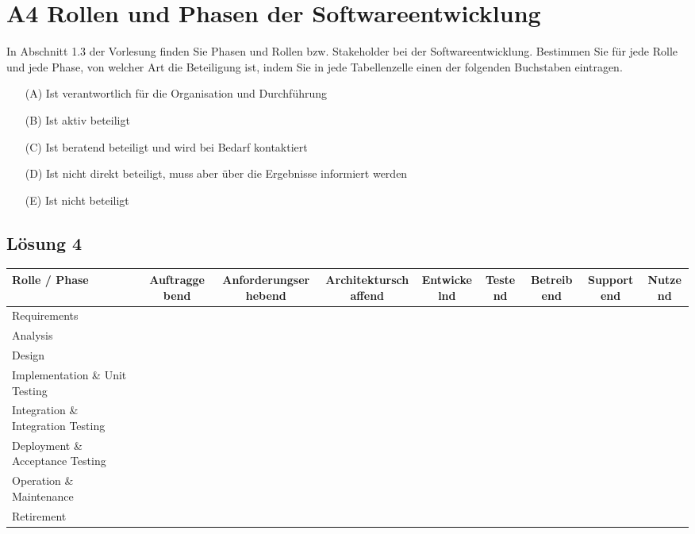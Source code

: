 \documentclass[main.tex]{subfiles}
\begin{document}
\section{A4 Rollen und Phasen der Softwareentwicklung}

In Abschnitt 1.3 der Vorlesung finden Sie Phasen und Rollen bzw. Stakeholder bei der Softwareentwicklung. Bestimmen Sie für jede Rolle und jede Phase, von welcher Art die Beteiligung ist, indem Sie in jede Tabellenzelle einen der folgenden Buchstaben eintragen.

\begin{enumerate}
    \item[(A)] Ist verantwortlich für die Organisation und Durchführung
    \item[(B)] Ist aktiv beteiligt
    \item[(C)] Ist beratend beteiligt und wird bei Bedarf kontaktiert
    \item[(D)] Ist nicht direkt beteiligt, muss aber über die Ergebnisse informiert werden
    \item[(E)] Ist nicht beteiligt
\end{enumerate}

\subsection{Lösung 4}
\begin{tabular}{m{4cm} | c | c | c | c | c | c | c | c |}
    Rolle / Phase 
    & Auftraggebend
    & Anforderungserhebend
    & Architekturschaffend
    & Entwickelnd
    & Testend
    & Betreibend
    & Supportend
    & Nutzend \\
    \hline

    Requirements                            & & & & & & & & \\
    \hline
    Analysis                                & & & & & & & & \\
    \hline
    Design                                  & & & & & & & & \\
    \hline
    Implementation \& Unit Testing          & & & & & & & & \\
    \hline
    Integration \& Integration Testing      & & & & & & & & \\
    \hline
    Deployment \& Acceptance Testing        & & & & & & & & \\
    \hline
    Operation \& Maintenance                & & & & & & & & \\
    \hline
    Retirement                              & & & & & & & & \\
    \hline
\end{tabular}
\end{document}
